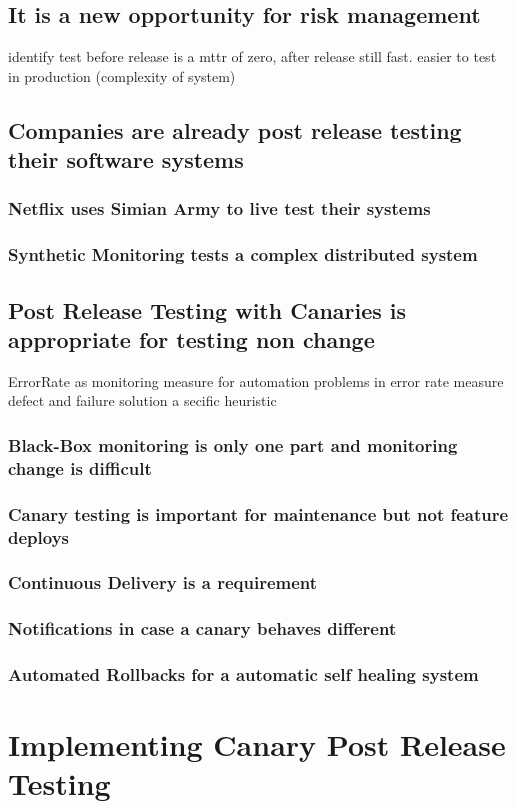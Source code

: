 \section{It is a new opportunity for risk management}
identify test before release is a mttr of zero, after release still fast. easier to test in production (complexity of system)
\section{Companies are already post release testing their software systems}
\subsection{Netflix uses Simian Army to live test their systems}
\subsection{Synthetic Monitoring tests a complex distributed system}
\section{Post Release Testing with Canaries is appropriate for testing non change}
ErrorRate as monitoring measure for automation
problems in error rate measure defect and failure
solution a secific heuristic
\subsection{Black-Box monitoring is only one part and monitoring change is difficult}
\subsection{Canary testing is important for maintenance but not feature deploys}
\subsection{Continuous Delivery is a requirement}
\subsection{Notifications in case a canary behaves different}
\subsection{Automated Rollbacks for a automatic self healing system}

\chapter{Implementing Canary Post Release Testing}
